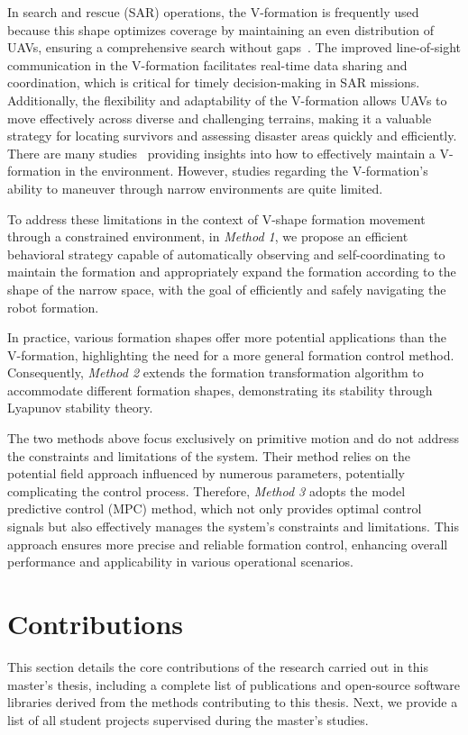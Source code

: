 In search and rescue (SAR) operations, the V-formation is frequently used because this shape optimizes coverage by maintaining an even distribution of UAVs, ensuring a comprehensive search without gaps~\cite{Dang2019,Mirzaeinia2019,8793765}. The improved line-of-sight communication in the V-formation facilitates real-time data sharing and coordination, which is critical for timely decision-making in SAR missions. Additionally, the flexibility and adaptability of the V-formation allows UAVs to move effectively across diverse and challenging terrains, making it a valuable strategy for locating survivors and assessing disaster areas quickly and efficiently. There are many studies~\cite{Dang2019,9990236,Zhang2019} providing insights into how to effectively maintain a V-formation in the environment. However, studies regarding the V-formation's ability to maneuver through narrow environments are quite limited.

To address these limitations in the context of V-shape formation movement through a constrained environment, in \textit{Method 1}, we propose an efficient behavioral strategy capable of automatically observing and self-coordinating to maintain the formation and appropriately expand the formation according to the shape of the narrow space, with the goal of efficiently and safely navigating the robot formation.

In practice, various formation shapes offer more potential applications than the V-formation, highlighting the need for a more general formation control method. Consequently, \textit{Method 2} extends the formation transformation algorithm to accommodate different formation shapes, demonstrating its stability through Lyapunov stability theory.

The two methods above focus exclusively on primitive motion and do not address the constraints and limitations of the system. Their method relies on the potential field approach influenced by numerous parameters, potentially complicating the control process. Therefore, \textit{Method 3} adopts the model predictive control (MPC) method, which not only provides optimal control signals but also effectively manages the system's constraints and limitations. This approach ensures more precise and reliable formation control, enhancing overall performance and applicability in various operational scenarios.

\section{Contributions}
This section details the core contributions of the research carried out in this master's thesis, including a complete list of publications and open-source software libraries derived from the methods contributing to this thesis. Next, we provide a list of all student projects supervised during the master's studies.


